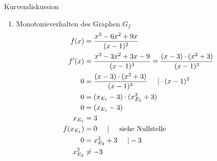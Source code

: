 \begin{bsp}{Kurvendiskussion}{}
\begin{enumerate}
\begin{equation*}
    \begin{split}
        0 &= f(x)\\
         0 &= \dfrac{x^3-6x^2+9x}{(x-1)^2} \hspace{0.5cm} | \cdot (x-1)^2\\
         0&= x^3-6x^2+9x\\
         &= x\cdot(x^2-6x+9)\\
         x_1 &= 0\\
         x_{2/3} &= \dfrac{6\pm \sqrt{36 -4\cdot 1 \cdot 9}}{2 \cdot 1}\\
         &= \dfrac{6\pm \sqrt{36-36}}{2}\\
         &= \dfrac{6}{2} = 3
    \end{split}
\end{equation*}
Damit ergibt sich eine einfache Nullstelle bei $x_1= 0$ und eine doppelte Nullstelle bei $x_{2/3} = 3$
\begin{equation*}
    \begin{split}
        f(0) &= \dfrac{0^3-6\cdot0^2+9\cdot 0}{(0-1)^2}\\
         &= \dfrac{0}{1} = 0
    \end{split}
\end{equation*}
Der Schnittpunkt mit der y-Achse ergibt sich damit bei $SP_{\text{y}}(0|0)$.
 \item Monotonieverhalten des Graphen $G_f$
 \begin{equation*}
    \begin{split}
        f(x) &= \dfrac{x^3-6x^2+9x}{(x-1)^2}\\
         f'(x) &= \dfrac{x^3-3x^2+3x-9}{(x-1)^3} = \dfrac{(x-3)\cdot (x^2+3)}{(x-1)^3}\\
         0 &= \dfrac{(x-3)\cdot (x^2+3)}{(x-1)^3} \hspace{0.5cm} | \cdot (x-1)^3\\
         0&=( x_{E_1}-3)\cdot (x_{E_2}^2+3)\\
         0 &= ( x_{E_1}-3)\\
         x_{E_1} &= 3\\
         f(x_{E_1}) &= 0 \hspace{0.5cm} | \hspace{0.5cm}\text{siehe Nullstelle}\\
         0&= x_{E_2}^2+3 \hspace{0.5cm} | -3 \\
         x_{E_2}^2&\neq -3
    \end{split}
\end{equation*}


\end{enumerate}
\end{bsp}
